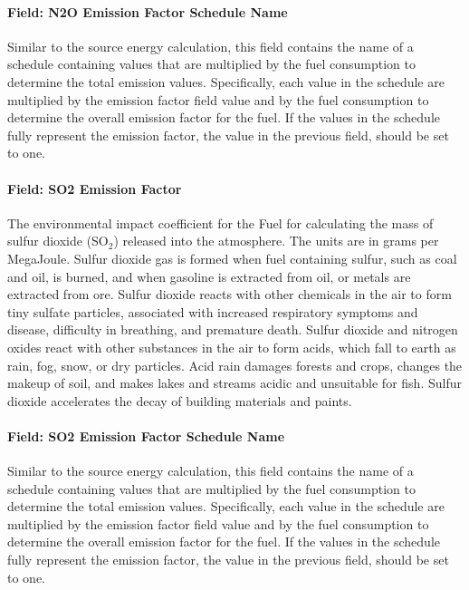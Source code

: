 \paragraph{Field: N2O Emission Factor Schedule Name}\label{field-n2o-emission-factor-schedule-name}

Similar to the source energy calculation, this field contains the name of a schedule containing values that are multiplied by the fuel consumption to determine the total emission values. Specifically, each value in the schedule are multiplied by the emission factor field value and by the fuel consumption to determine the overall emission factor for the fuel. If the values in the schedule fully represent the emission factor, the value in the previous field, should be set to one.

\paragraph{Field: SO2 Emission Factor}\label{field-so2-emission-factor}

The environmental impact coefficient for the Fuel for calculating the mass of sulfur dioxide (SO\(_{2}\)) released into the atmosphere. The units are in grams per MegaJoule. Sulfur dioxide gas is formed when fuel containing sulfur, such as coal and oil, is burned, and when gasoline is extracted from oil, or metals are extracted from ore. Sulfur dioxide reacts with other chemicals in the air to form tiny sulfate particles, associated with increased respiratory symptoms and disease, difficulty in breathing, and premature death. Sulfur dioxide and nitrogen oxides react with other substances in the air to form acids, which fall to earth as rain, fog, snow, or dry particles. Acid rain damages forests and crops, changes the makeup of soil, and makes lakes and streams acidic and unsuitable for fish. Sulfur dioxide accelerates the decay of building materials and paints.

\paragraph{Field: SO2 Emission Factor Schedule Name}\label{field-so2-emission-factor-schedule-name}

Similar to the source energy calculation, this field contains the name of a schedule containing values that are multiplied by the fuel consumption to determine the total emission values. Specifically, each value in the schedule are multiplied by the emission factor field value and by the fuel consumption to determine the overall emission factor for the fuel. If the values in the schedule fully represent the emission factor, the value in the previous field, should be set to one.

